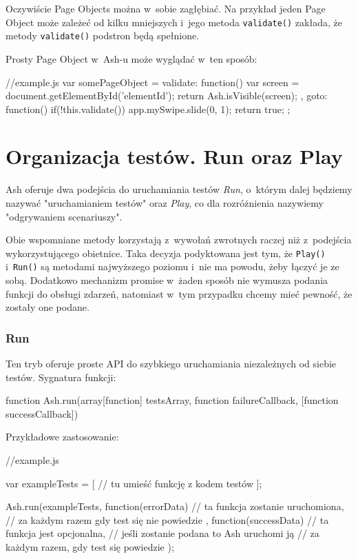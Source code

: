 \documentclass[brudnopis]{xmgr}
\begin{document}
Oczywiście Page Objects można w~sobie zagłębiać. Na przykład jeden Page Object może zależeć od kilku mniejszych i~jego metoda \texttt{validate()} zakłada, że metody \texttt{validate()} podstron będą spełnione. 

Prosty Page Object w~Ash-u może wyglądać w~ten sposób:

\begin{javascriptcode}
     //example.js
    var somePageObject = {
    	validate: function(){
      	    var screen = document.getElementById('elementId');
             return Ash.isVisible(screen);
          },
         goto: function(){
             if(!this.validate()) app.mySwipe.slide(0, 1);
             return true;
         }
    };
\end{javascriptcode}

\section{Organizacja testów. Run oraz Play}

Ash oferuje dwa podejścia do uruchamiania testów \textit{Run}, o~którym dalej będziemy nazywać "uruchamianiem testów" oraz \textit{Play}, co dla rozróżnienia nazywiemy "odgrywaniem scenariuszy".

Obie wspomniane metody korzystają z~wywołań zwrotnych raczej niż z~podejścia wykorzystującego obietnice. Taka decyzja podyktowana jest tym, że \texttt{Play()} i~\texttt{Run()} są metodami najwyższego poziomu i~nie ma powodu, żeby łączyć je ze sobą. Dodatkowo mechanizm promise w~żaden sposób nie wymusza podania funkcji do obsługi zdarzeń, natomiast w~tym przypadku chcemy mieć pewność, że zostały one podane.  

\subsubsection{Run}

Ten tryb oferuje proste API do szybkiego uruchamiania niezależnych od siebie testów. Sygnatura funkcji: 

\begin{javascriptcode}
  function Ash.run(array[function] testsArray, 
                                   function failureCallback, 
                                   [function successCallback]) 
\end{javascriptcode}

Przykładowe zastosowanie: 

\begin{javascriptcode}
     //example.js

    var exampleTests = [
	//  tu umieść funkcję z kodem testów 
    ];

    Ash.run(exampleTests, function(errorData){
      // ta funkcja zostanie uruchomiona, 
      //   za każdym razem gdy test się nie powiedzie
    }, function(successData){
      // ta funkcja jest opcjonalna, 
      //   jeśli zostanie podana to Ash uruchomi ją 
      //   za każdym razem, gdy test się powiedzie
    });
\end{javascriptcode}
\end{document}
